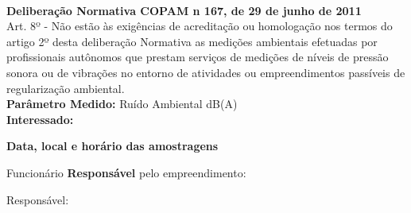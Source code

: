 \begin{SingleSpacing}
\begin{scriptsize}
\begin{Spacing}{0}
\begin{tiny}
\begin{itemize}
\end{itemize}
\end{tiny}
\end{Spacing}
\end{scriptsize}

\

\textbf{Deliberação Normativa COPAM n 167, de 29 de junho de 2011} \\

Art. 8º - Não estão às exigências de acreditação ou homologação nos termos do artigo 2º desta deliberação Normativa as medições ambientais efetuadas por profissionais autônomos que prestam serviços de medições de níveis de pressão sonora ou de vibrações no entorno de atividades ou empreendimentos passíveis de regularização ambiental. \\

\textbf{Parâmetro Medido:} Ruído Ambiental dB(A) \\

\textbf{Interessado:} 
\begin{center}
\textbf{Data, local e horário das amostragens}
\end{center}


Funcionário \textbf{Responsável} pelo empreendimento: \textbf{} \\
\begin{tiny}
Responsável: 
\end{tiny}
\end{SingleSpacing}



